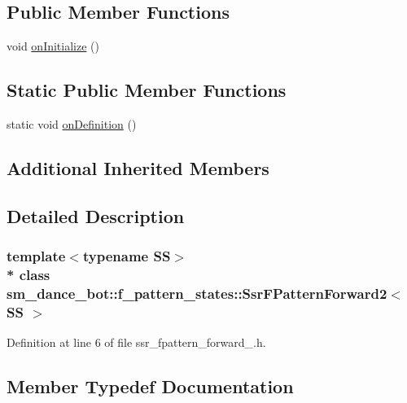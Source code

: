 \subsection*{Public Member Functions}
\begin{DoxyCompactItemize}
\item 
void \hyperlink{structsm__dance__bot_1_1f__pattern__states_1_1SsrFPatternForward2_abeb5931a494e9fbccdc1401c17bc24de}{on\+Initialize} ()
\end{DoxyCompactItemize}
\subsection*{Static Public Member Functions}
\begin{DoxyCompactItemize}
\item 
static void \hyperlink{structsm__dance__bot_1_1f__pattern__states_1_1SsrFPatternForward2_a5dbfe46f7dc827a9dbadea9d503cf1da}{on\+Definition} ()
\end{DoxyCompactItemize}
\subsection*{Additional Inherited Members}


\subsection{Detailed Description}
\subsubsection*{template$<$typename SS$>$\\*
class sm\+\_\+dance\+\_\+bot\+::f\+\_\+pattern\+\_\+states\+::\+Ssr\+F\+Pattern\+Forward2$<$ S\+S $>$}



Definition at line 6 of file ssr\+\_\+fpattern\+\_\+forward\+\_.\+h.



\subsection{Member Typedef Documentation}
